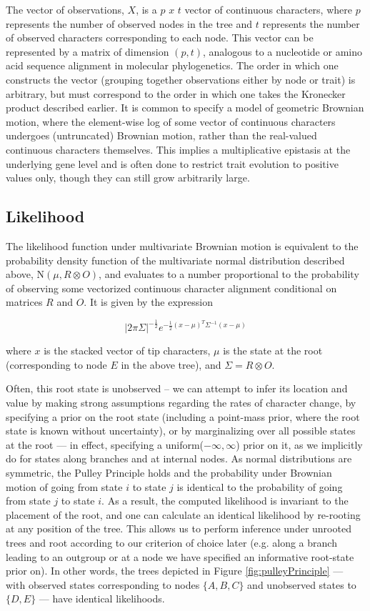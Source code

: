 \documentclass[10pt, twocolumn, twoside]{article}
\begin{document}
The vector of observations, $X$, is a $p$ $x$ $t$ vector of continuous characters, where $p$ represents the number of observed nodes in the tree and $t$ represents the number of observed characters corresponding to each node. This vector can be represented by a matrix of dimension $(p, t)$, analogous to a nucleotide or amino acid sequence alignment in molecular phylogenetics. The order in which one constructs the vector (grouping together observations either by node or trait) is arbitrary, but must correspond to the order in which one takes the Kronecker product described earlier. It is common to specify a model of geometric Brownian motion, where the element-wise log of some vector of continuous characters undergoes (untruncated) Brownian motion, rather than the real-valued continuous characters themselves. This implies a multiplicative epistasis at the underlying gene level and is often done to restrict trait evolution to positive values only, though they can still grow arbitrarily large. 

\subsection{Likelihood}
The likelihood function under multivariate Brownian motion is equivalent to the probability density function of the multivariate normal distribution described above, N$(\mu, R \otimes O)$, and evaluates to a number proportional to the probability of observing some vectorized continuous character alignment conditional on matrices $R$ and $O$. It is given by the expression

{\large\[|2\pi\Sigma|^{-\frac{1}{2}}e^{-\frac{1}{2}(x-\mu)^T\Sigma^{-1}(x-\mu)}\]}

where $x$ is the stacked vector of tip characters, $\mu$ is the state at the root (corresponding to node $E$ in the above tree), and $\Sigma = R \otimes O$.

Often, this root state is unobserved – we can attempt to infer its location and value by making strong assumptions regarding the rates of character change, by specifying a prior on the root state (including a point-mass prior, where the root state is known without uncertainty), or by marginalizing over all possible states at the root — in effect, specifying a uniform($-\infty, \infty$) prior on it, as we implicitly do for states along branches and at internal nodes. As normal distributions are symmetric, the Pulley Principle holds \citep{felsensteinEvolutionaryTreesGene1981} and the probability under Brownian motion of going from state $i$ to state $j$ is identical to the probability of going from state $j$ to state $i$. As a result, the computed likelihood is invariant to the placement of the root, and one can calculate an identical likelihood by re-rooting at any position of the tree. This allows us to perform inference under unrooted trees and root according to our criterion of choice later (e.g. along a branch leading to an outgroup or at a node we have specified an informative root-state prior on). In other words, the trees depicted in Figure \ref{fig:pulleyPrinciple} — with observed states corresponding to nodes $\{A, B, C\}$ and unobserved states to $\{D, E\}$ — have identical likelihoods.
\end{document}
